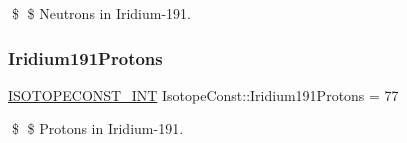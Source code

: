 \$ \$ Neutrons in Iridium-\/191. \mbox{\label{group___isotope_const-_iridium-_ir191_gab024d3a2e94d1ffbdf79873407e2c7a2}} 
\subsubsection{\texorpdfstring{Iridium191\+Protons}{Iridium191Protons}}
{\footnotesize\ttfamily \mbox{\hyperlink{group___isotope_const-_macros_ga5f18360b3e99483a35c32d789e62621c}{I\+S\+O\+T\+O\+P\+E\+C\+O\+N\+S\+T\+\_\+\+I\+NT}} Isotope\+Const\+::\+Iridium191\+Protons = 77}

\$ \$ Protons in Iridium-\/191. 